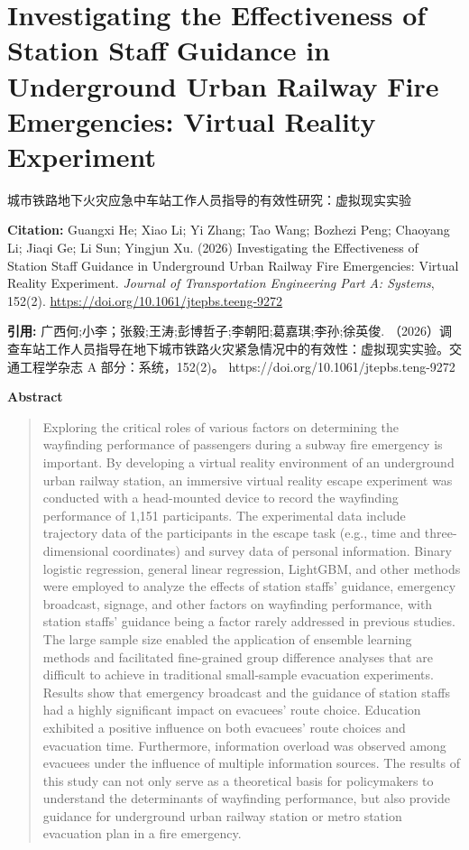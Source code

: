 \vspace{0.5em}


\chapter{Investigating the Effectiveness of Station Staff Guidance in Underground Urban Railway Fire Emergencies: Virtual Reality Experiment}
\begin{center}\small 城市铁路地下火灾应急中车站工作人员指导的有效性研究：虚拟现实实验\end{center}

\noindent\textbf{Citation:} Guangxi He; Xiao Li; Yi Zhang; Tao Wang; Bozhezi Peng; Chaoyang Li; Jiaqi Ge; Li Sun; Yingjun Xu. (2026) Investigating the Effectiveness of Station Staff Guidance in Underground Urban Railway Fire Emergencies: Virtual Reality Experiment. \textit{Journal of Transportation Engineering Part A: Systems}, 152(2). \url{https://doi.org/10.1061/jtepbs.teeng-9272}

\vspace{0.5em}
\noindent\textbf{引用:} 广西何;小李；张毅;王涛;彭博哲子;李朝阳;葛嘉琪;李孙;徐英俊. （2026）调查车站工作人员指导在地下城市铁路火灾紧急情况中的有效性：虚拟现实实验。交通工程学杂志 A 部分：系统，152(2)。 https://doi.org/10.1061/jtepbs.teng-9272

\vspace{1.5em}
\noindent\textbf{Abstract}\par
\begin{quote}\small
Exploring the critical roles of various factors on determining the wayfinding performance of passengers during a subway fire emergency is important. By developing a virtual reality environment of an underground urban railway station, an immersive virtual reality escape experiment was conducted with a head-mounted device to record the wayfinding performance of 1,151 participants. The experimental data include trajectory data of the participants in the escape task (e.g., time and three-dimensional coordinates) and survey data of personal information. Binary logistic regression, general linear regression, LightGBM, and other methods were employed to analyze the effects of station staffs’ guidance, emergency broadcast, signage, and other factors on wayfinding performance, with station staffs’ guidance being a factor rarely addressed in previous studies. The large sample size enabled the application of ensemble learning methods and facilitated fine-grained group difference analyses that are difficult to achieve in traditional small-sample evacuation experiments. Results show that emergency broadcast and the guidance of station staffs had a highly significant impact on evacuees’ route choice. Education exhibited a positive influence on both evacuees’ route choices and evacuation time. Furthermore, information overload was observed among evacuees under the influence of multiple information sources. The results of this study can not only serve as a theoretical basis for policymakers to understand the determinants of wayfinding performance, but also provide guidance for underground urban railway station or metro station evacuation plan in a fire emergency.
\end{quote}

